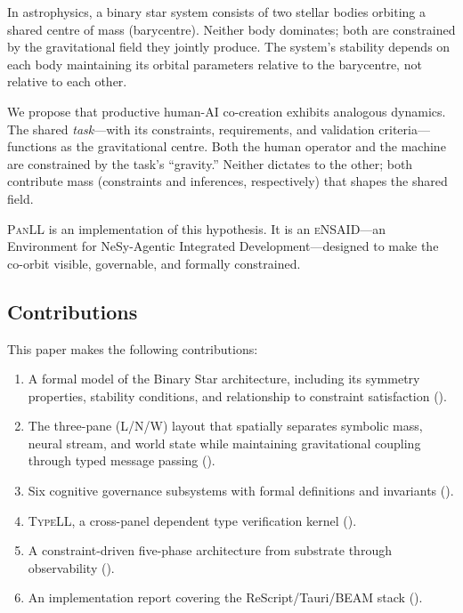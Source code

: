 \documentclass[11pt,a4paper]{article}
\newcommand{\panll}{\textsc{PanLL}}
\newcommand{\typell}{\textsc{TypeLL}}
\newcommand{\ensaid}{\textsc{eNSAID}}
\begin{document}
In astrophysics, a binary star system consists of two stellar bodies
orbiting a shared centre of mass (barycentre). Neither body dominates;
both are constrained by the gravitational field they jointly produce.
The system's stability depends on each body maintaining its orbital
parameters relative to the barycentre, not relative to each other.

We propose that productive human-AI co-creation exhibits analogous
dynamics. The shared \textit{task}---with its constraints, requirements,
and validation criteria---functions as the gravitational centre. Both
the human operator and the machine are constrained by the task's
``gravity.'' Neither dictates to the other; both contribute mass
(constraints and inferences, respectively) that shapes the shared
field.

\panll{} is an implementation of this hypothesis. It is an \ensaid{}---an
Environment for NeSy-Agentic Integrated Development---designed to
make the co-orbit visible, governable, and formally constrained.

\subsection{Contributions}

This paper makes the following contributions:

\begin{enumerate}
  \item A formal model of the Binary Star architecture, including its
    symmetry properties, stability conditions, and relationship to
    constraint satisfaction ().
  \item The three-pane (L/N/W) layout that spatially separates symbolic
    mass, neural stream, and world state while maintaining
    gravitational coupling through typed message passing
    ().
  \item Six cognitive governance subsystems with formal definitions and
    invariants ().
  \item \typell{}, a cross-panel dependent type verification kernel
    ().
  \item A constraint-driven five-phase architecture from substrate
    through observability ().
  \item An implementation report covering the ReScript/Tauri/BEAM stack
    ().
\end{enumerate}
\end{document}

